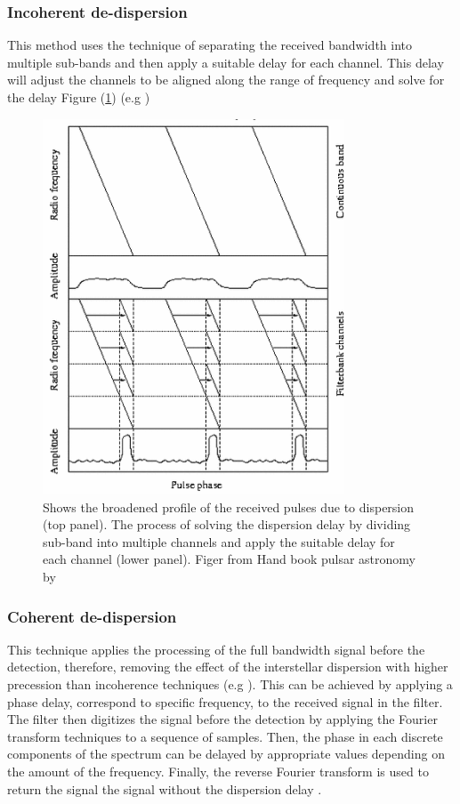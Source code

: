 \subsubsection*{Incoherent de-dispersion}
This method uses the technique of separating the received bandwidth into multiple sub-bands and then apply a suitable delay for each channel. This delay will adjust the channels to be aligned along the range of frequency and solve for the delay Figure (\ref{fig:de-DM}) (e.g \citet{large1971search}) 

\begin{figure}[htbp!] 
\centering    
\includegraphics[width=0.8\textwidth]{de_dm.png}
\caption[The de-dispersion]{Shows the broadened profile of the received pulses due to dispersion (top panel). The process of solving the dispersion delay by dividing sub-band into multiple channels and apply the suitable delay for each channel (lower panel).
Figer from Hand book pulsar astronomy by \citet{lorimer2005handbook} }
\label{fig:de-DM}
\end{figure}



\subsubsection*{Coherent de-dispersion}
This technique applies the processing of the full bandwidth signal before the detection, therefore, removing the effect of the interstellar dispersion with higher precession than incoherence techniques (e.g   
\citet{rickett1975radio}). This can be achieved by applying a phase delay, correspond to specific frequency, to the received signal in the filter. The filter then digitizes the signal before the detection by applying the Fourier transform techniques to a sequence of samples. Then, the phase in each discrete components of the spectrum can be delayed by appropriate values depending on the amount of the frequency. Finally, the reverse Fourier transform is used to return the signal the signal without the dispersion delay \citet{lyne2012pulsar}.      


